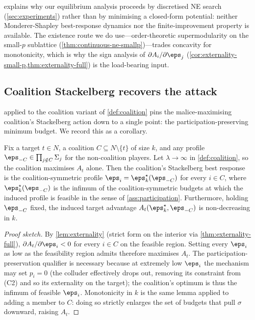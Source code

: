  explains why our equilibrium analysis proceeds
by discretised NE search (\cref{sec:experiments}) rather than by
minimising a closed-form potential: neither Monderer-Shapley
best-response dynamics nor the finite-improvement property is available.
The existence route we do use---order-theoretic supermodularity on the
small-$p$ sublattice (\cref{thm:continuous-ne-smallp})---trades concavity
for monotonicity, which is why the sign analysis of
$\partial A_i / \partial \eps_j$
(\cref{cor:externality-small-p,thm:externality-full})
is the load-bearing input.

\subsection{Coalition Stackelberg recovers the attack}

 applied to the coalition variant of
\cref{def:coalition} pins the malice-maximising coalition's Stackelberg
action down to a single point: the participation-preserving minimum
budget. We record this as a corollary.

\begin{corollary}
\label{cor:coalition-attack}
Fix a target $t \in N$, a coalition $C \subseteq N \setminus \{t\}$ of
size $k$, and any profile $\boldsymbol{\eps}_{-C} \in \prod_{j \notin C}
\Sigma_j$ for the non-coalition players. Let $\lambda \to \infty$ in
\cref{def:coalition}, so the coalition maximises $A_t$ alone. Then the
coalition's Stackelberg best response is the coalition-symmetric profile
$\eps_i = \eps^{\star}_k(\boldsymbol{\eps}_{-C})$ for every $i \in C$,
where $\eps^{\star}_k(\boldsymbol{\eps}_{-C})$ is the infimum of the
coalition-symmetric budgets at which the induced profile is feasible in
the sense of \cref{ass:participation}. Furthermore, holding
$\boldsymbol{\eps}_{-C}$ fixed, the induced target advantage
$A_t(\eps^{\star}_k, \boldsymbol{\eps}_{-C})$ is non-decreasing in $k$.
\end{corollary}

\begin{proof}[Proof sketch]
By \cref{lem:externality} (strict form on the interior via
\cref{thm:externality-full}), $\partial A_t / \partial \eps_i < 0$ for
every $i \in C$ on the feasible region. Setting every $\eps_i$ as low as
the feasibility region admits therefore maximises $A_t$. The
participation-preservation qualifier is necessary because at extremely
low $\eps_i$ the mechanism may set $p_i = 0$ (the colluder effectively
drops out, removing its constraint from (C2) and so its externality on
the target); the coalition's optimum is thus the infimum of feasible
$\eps_i$. Monotonicity in $k$ is the same lemma applied to adding a
member to $C$: doing so strictly enlarges the set of budgets that pull
$\sigma$ downward, raising $A_t$.
\end{proof}

